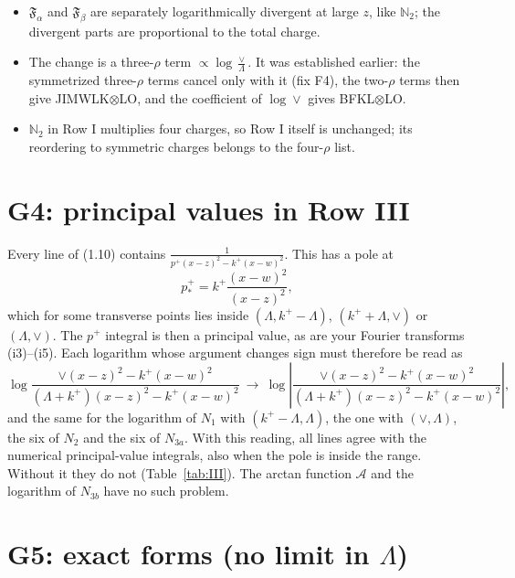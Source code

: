 \documentclass[10pt]{article}
\numberwithin{equation}{section}
\def\mf#1{\mathbb{#1}}
\begin{document}
\begin{itemize}
\item $\mathfrak F_\alpha$ and $\mathfrak F_\beta$ are separately logarithmically divergent at large $z$, like $\mf N_2$; the divergent parts are proportional to the total charge.
\item The change is a three-$\rho$ term $\propto\log\frac{\vee}{\Lambda}$. It was established earlier: the symmetrized three-$\rho$ terms cancel only with it (fix F4), the two-$\rho$ terms then give JIMWLK$\otimes$LO, and the coefficient of $\log\vee$ gives BFKL$\otimes$LO.
\item $\mf N_2$ in Row I multiplies four charges, so Row I itself is unchanged; its reordering to symmetric charges belongs to the four-$\rho$ list.
\end{itemize}

\section{G4: principal values in Row III}\label{sec:G4}
Every line of (1.10) contains $\frac{1}{p^+(x-z)^2-k^+(x-w)^2}$. This has a pole at
\begin{equation}
p^+_*=k^+\frac{(x-w)^2}{(x-z)^2},
\end{equation}
which for some transverse points lies inside $(\Lambda,k^+-\Lambda)$, $(k^++\Lambda,\vee)$ or $(\Lambda,\vee)$. The $p^+$ integral is then a principal value, as are your Fourier transforms (i3)--(i5). Each logarithm whose argument changes sign must therefore be read as
\begin{equation}
\log\frac{\vee(x-z)^2-k^+(x-w)^2}{(\Lambda+k^+)(x-z)^2-k^+(x-w)^2}\ \to\ \log\left|\frac{\vee(x-z)^2-k^+(x-w)^2}{(\Lambda+k^+)(x-z)^2-k^+(x-w)^2}\right|,
\end{equation}
and the same for the logarithm of $N_1$ with $(k^+-\Lambda,\Lambda)$, the one with $(\vee,\Lambda)$, the six of $N_2$ and the six of $N_{3a}$. With this reading, all lines agree with the numerical principal-value integrals, also when the pole is inside the range. Without it they do not (Table~\ref{tab:III}). The arctan function $\mathcal A$ and the logarithm of $N_{3b}$ have no such problem.

\section{G5: exact forms (no limit in \texorpdfstring{$\Lambda$}{Lambda})}\label{sec:G5}
\end{document}
